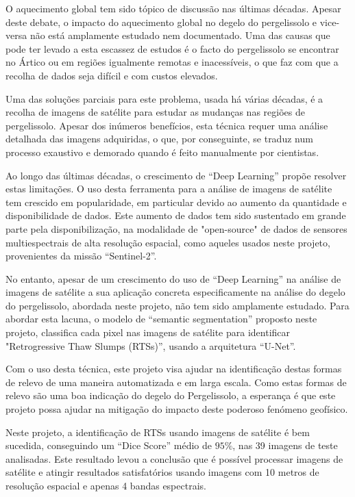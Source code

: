 O aquecimento global tem sido tópico de discussão nas últimas décadas. Apesar deste debate, o impacto do aquecimento global no degelo do pergelissolo e vice-versa não está amplamente estudado nem documentado. Uma das causas que pode ter levado a esta escassez de estudos é o facto do pergelissolo se encontrar no Ártico ou em regiões igualmente remotas e inacessíveis, o que faz com que a recolha de dados seja difícil e com custos elevados.

Uma das soluções parciais para este problema, usada há várias décadas, é a recolha de imagens de satélite para estudar as mudanças nas regiões de pergelissolo. Apesar dos inúmeros benefícios, esta técnica requer uma análise detalhada das imagens adquiridas, o que, por conseguinte, se traduz num processo exaustivo e demorado quando é feito manualmente por cientistas. 

Ao longo das últimas décadas, o crescimento de “Deep Learning” propõe resolver estas limitações. O uso desta ferramenta para a análise de imagens de satélite tem crescido em popularidade, em particular devido ao aumento da quantidade e disponibilidade de dados. Este aumento de dados tem sido sustentado em grande parte pela disponibilização, na modalidade de "open-source" de dados de sensores multiespectrais de alta resolução espacial, como aqueles usados neste projeto, provenientes da missão “Sentinel-2”.

No entanto, apesar de um crescimento do uso de “Deep Learning” na análise de imagens de satélite a sua aplicação concreta especificamente na análise do degelo do pergelissolo, abordada neste projeto, não tem sido amplamente estudado. Para abordar esta lacuna, o modelo de “semantic segmentation” proposto neste projeto, classifica cada pixel nas imagens de satélite para identificar "Retrogressive Thaw Slumps (RTSs)”, usando a arquitetura “U-Net”.

Com o uso desta técnica, este projeto visa ajudar na identificação destas formas de relevo de uma maneira automatizada e em larga escala. Como estas formas de relevo são uma boa indicação do degelo do Pergelissolo, a esperança é que este projeto possa ajudar na mitigação do impacto deste poderoso fenómeno geofísico.

Neste projeto, a identificação de RTSs usando imagens de satélite é bem sucedida, conseguindo um “Dice Score” médio de $95\%$, nas 39 imagens de teste analisadas. Este resultado levou a conclusão que é possível processar imagens de satélite e atingir resultados satisfatórios usando imagens com 10 metros de resolução espacial e apenas 4 bandas espectrais.


